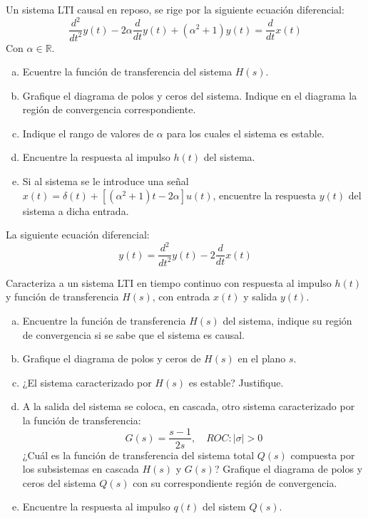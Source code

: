 \begin{ejercicio}
	Un sistema LTI causal en reposo, se rige por la siguiente ecuación diferencial:
		$$ \frac{d^2}{dt^2}y(t) - 2\alpha \frac{d}{dt}y(t) + (\alpha^2+1)y(t) = \frac{d}{dt}x(t) $$
	Con $\alpha \in \mathbb{R}$.
	\begin{enumerate}[a.]
		\item Ecuentre la función de transferencia del sistema $H(s)$.
		\item Grafique el diagrama de polos y ceros del sistema. Indique en el diagrama la región de convergencia correspondiente. 
		\item Indique el rango de valores de $\alpha$ para los cuales el sistema es estable.
		\item Encuentre la respuesta al impulso $h(t)$ del sistema.
		\item Si al sistema se le introduce una señal $x(t) = \delta(t) + [(\alpha^2+1)t - 2 \alpha]u(t)$, encuentre la respuesta $y(t)$ del sistema a dicha entrada.
	\end{enumerate}
\end{ejercicio}

\begin{ejercicio}
	La siguiente ecuación diferencial:
		$$ y(t) = \frac{d^2}{dt^2}y(t) - 2 \frac{d}{dt}x(t) $$

	Caracteriza a un sistema LTI en tiempo continuo con respuesta al impulso $h(t)$ y función de transferencia $H(s)$, con entrada $x(t)$ y salida $y(t)$.

	\begin{enumerate}[a.]
		\item Encuentre la función de transferencia $H(s)$ del sistema, indique su región de convergencia si se sabe que el sistema es causal.
		\item Grafique el diagrama de polos y ceros de $H(s)$ en el plano $s$.
		\item ¿El sistema caracterizado por $H(s)$ es estable? Justifique.
		\item A la salida del sistema se coloca, en cascada, otro sistema caracterizado por la función de transferencia:
			$$ G(s) = \frac{s-1}{2s},\quad ROC:|\sigma|>0 $$
		¿Cuál es la función de transferencia del sistema total $Q(s)$ compuesta por los subsistemas en cascada $H(s)$ y $G(s)$? Grafique el diagrama de polos y ceros del sistema $Q(s)$ con su correspondiente región de convergencia.
		\item Encuentre la respuesta al impulso $q(t)$ del sistem $Q(s)$.
	\end{enumerate}
\end{ejercicio}
